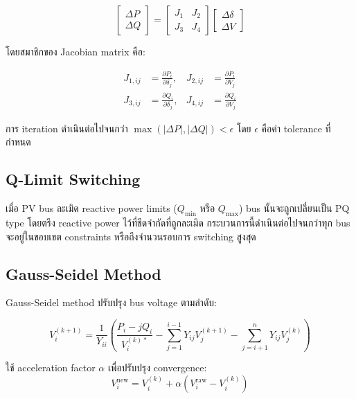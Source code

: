 \documentclass[12pt,a4paper]{article}
\begin{document}
\begin{equation}
\begin{bmatrix} \Delta P \\ \Delta Q \end{bmatrix} =
\begin{bmatrix} J_1 & J_2 \\ J_3 & J_4 \end{bmatrix}
\begin{bmatrix} \Delta \delta \\ \Delta V \end{bmatrix}
\end{equation}

โดยสมาชิกของ Jacobian matrix คือ:

\begin{align}
J_{1,ij} &= \frac{\partial P_i}{\partial \delta_j}, & J_{2,ij} &= \frac{\partial P_i}{\partial V_j} \\
J_{3,ij} &= \frac{\partial Q_i}{\partial \delta_j}, & J_{4,ij} &= \frac{\partial Q_i}{\partial V_j}
\end{align}

การ iteration ดำเนินต่อไปจนกว่า $\max(|\Delta P|, |\Delta Q|) < \epsilon$ โดย $\epsilon$ คือค่า tolerance ที่กำหนด

\subsection{Q-Limit Switching}

เมื่อ PV bus ละเมิด reactive power limits ($Q_{\min}$ หรือ $Q_{\max}$) bus นั้นจะถูกเปลี่ยนเป็น PQ type โดยตรึง reactive power ไว้ที่ขีดจำกัดที่ถูกละเมิด กระบวนการนี้ดำเนินต่อไปจนกว่าทุก bus จะอยู่ในขอบเขต constraints หรือถึงจำนวนรอบการ switching สูงสุด

\subsection{Gauss-Seidel Method}

Gauss-Seidel method ปรับปรุง bus voltage ตามลำดับ:

\begin{equation}
V_i^{(k+1)} = \frac{1}{Y_{ii}} \left( \frac{P_i - jQ_i}{V_i^{(k)*}} - \sum_{j=1}^{i-1} Y_{ij} V_j^{(k+1)} - \sum_{j=i+1}^{n} Y_{ij} V_j^{(k)} \right)
\end{equation}

ใช้ acceleration factor $\alpha$ เพื่อปรับปรุง convergence:
\begin{equation}
V_i^{\text{new}} = V_i^{(k)} + \alpha \left( V_i^{\text{raw}} - V_i^{(k)} \right)
\end{equation}
\end{document}
